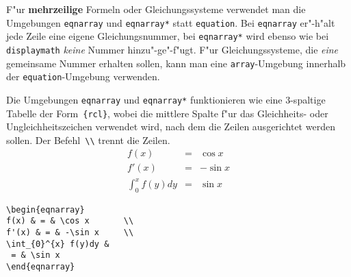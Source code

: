 \begin{sloppypar}
F"ur \textbf{mehrzeilige} Formeln oder Gleichungssysteme
verwendet man die Umgebungen \texttt{eqnarray} und
\texttt{eqnarray*} statt \texttt{equation}.
Bei \texttt{eqnarray} er"-h"alt jede Zeile eine eigene
Gleichungsnummer, bei \texttt{eqnarray*} wird ebenso wie bei
\texttt{displaymath} \emph{keine} Nummer hinzu"-ge"-f"ugt.
F"ur Gleichungssysteme, die \emph{eine} gemeinsame Nummer
erhalten sollen, kann man eine \texttt{array}-Umgebung innerhalb
der \texttt{equation}-Umgebung verwenden.
\end{sloppypar}

Die Umgebungen \texttt{eqnarray} und \texttt{eqnarray*}
funktionieren wie eine 3-spaltige Tabelle der Form~\verb|{rcl}|,
wobei die mittlere Spalte f"ur das Gleichheits- oder
Ungleichheitszeichen verwendet wird, nach dem die Zeilen
ausgerichtet werden sollen.
Der Befehl~\verb|\\| trennt die Zeilen.
\exa
\begin{eqnarray}
f(x) & = & \cos x       \\
f'(x) & = & -\sin x     \\
\int_{0}^{x} f(y)dy &
 = & \sin x
\end{eqnarray}
\exb
\begin{verbatim}
\begin{eqnarray}
f(x) & = & \cos x       \\
f'(x) & = & -\sin x     \\
\int_{0}^{x} f(y)dy &
 = & \sin x
\end{eqnarray}
\end{verbatim}
\exc
 
